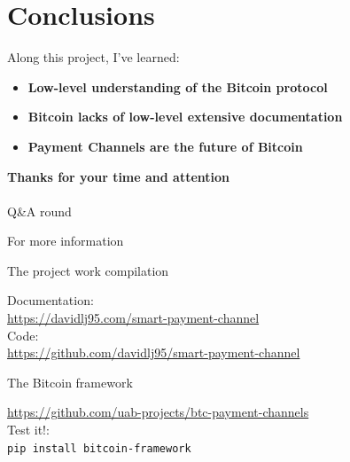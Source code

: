 \documentclass{beamer}
\begin{document}
\section{Conclusions}
\begin{frame}
 Along this project, I've learned:
 \begin{itemize}
  \item \textbf{Low-level understanding of the Bitcoin protocol}
  \item \textbf{Bitcoin lacks of low-level extensive documentation}
  \item \textbf{Payment Channels are the future of Bitcoin}
 \end{itemize}
\end{frame}
\begin{frame}
 \begin{center}
  \textbf{\huge{Thanks for your time and attention}}\\~\\
  \huge{Q\&A round}
 \end{center}
\end{frame}
\begin{frame}{For more information}
 \begin{block}{The project work compilation}
  \begin{center}
   Documentation:\\
   \url{https://davidlj95.com/smart-payment-channel}\\
   Code:\\
   \url{https://github.com/davidlj95/smart-payment-channel}
  \end{center}
 \end{block}
 \begin{block}{The Bitcoin framework}
  \begin{center}
   \url{https://github.com/uab-projects/btc-payment-channels}\\
   Test it!:\\
   \texttt{pip install bitcoin-framework}
  \end{center}
 \end{block}
\end{frame}
\end{document}
